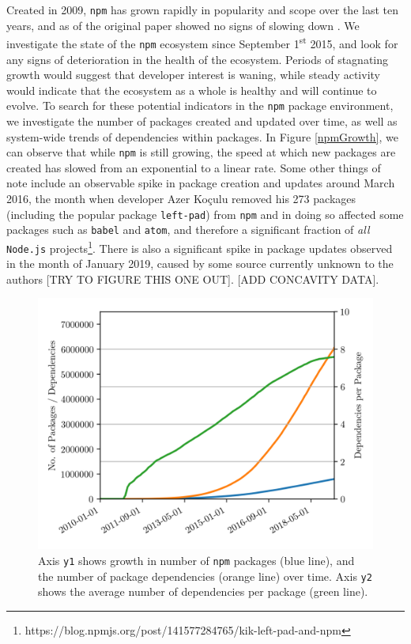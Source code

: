\documentclass[10pt,conference]{IEEEtran}
\def\code#1{\texttt{#1}}
\begin{document}
Created in 2009, \code{npm} has grown
rapidly in popularity and scope over the last ten years, and 
as of the original paper showed no signs of slowing down \cite{Wittern:2016}.
We investigate the state of the \code{npm} ecosystem
since September 1\textsuperscript{st} 2015, and look for any signs of deterioration in 
the health of the ecosystem. Periods of stagnating growth would suggest
that developer interest is waning, while steady activity would 
indicate that the ecosystem as a whole is healthy and will continue to
evolve. To search for these potential indicators in the \code{npm} package environment,
we investigate the number of packages created and updated over time, as well
as system-wide trends of dependencies within packages. 
In Figure \ref{npmGrowth},
we can observe that while \code{npm} is still growing, the speed at which new packages
are created has slowed from an exponential to a linear rate. Some other things of note 
include an observable spike in package creation and updates around March 2016, the month 
when developer Azer Ko\c{c}ulu removed his 273 packages (including the popular package 
\code{left-pad}) from \code{npm} and in doing so affected some packages such as 
\code{babel} and \code{atom}, and therefore a significant fraction of \emph{all} 
\code{Node.js} projects\footnote{https://blog.npmjs.org/post/141577284765/kik-left-pad-and-npm}.
There is also a significant spike in package updates observed in the month of January 2019, caused 
by some source currently unknown to the authors [TRY TO FIGURE THIS ONE OUT].
[ADD CONCAVITY DATA]. 

\begin{figure}
  \includegraphics[width=1\linewidth]{figures/packages_vs_dependencies.png}
  \caption{Axis \code{y1} shows growth in number of \code{npm} packages (blue line), and the number of package dependencies (orange line) over time. 
  Axis \code{y2} shows the average number of dependencies per package (green line).}
  \label{packVSDependencies}
\end{figure}
\end{document}
